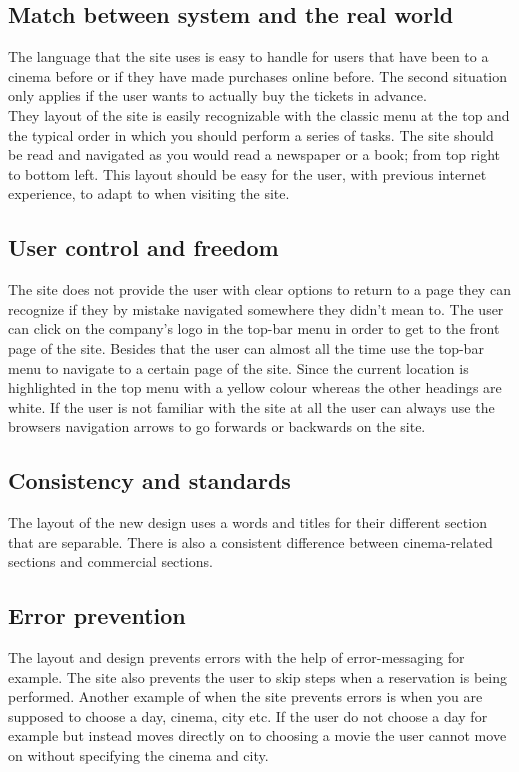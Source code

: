 \documentclass[a4paper,11pt]{article}
\begin{document}
\subsection{Match between system and the real world}
The language that the site uses is easy to handle for users that have been to a cinema before or if they have made purchases online before. The second situation only applies if the user wants to actually buy the tickets in advance. \\
They layout of the site is easily recognizable with the classic menu at the top and the typical order in which you should perform a series of tasks. The site should be read and navigated as you would read a newspaper or a book; from top right to bottom left. This layout should be easy for the user, with previous internet experience, to adapt to when visiting the site. 

\subsection{User control and freedom}
The site does not provide the user with clear options to return to a page they can recognize if they by mistake navigated somewhere they didn't mean to. The user can click on the company’s logo in the top-bar menu in order to get to the front page of the site. Besides that the user can almost all the time use the top-bar menu to navigate to a certain page of the site. Since the current location is highlighted in the top menu with a yellow colour whereas the other headings are white. 
If the user is not familiar with the site at all the user can always use the browsers navigation arrows to go forwards or backwards on the site.

\subsection{Consistency and standards}
The layout of the new design uses a words and titles for their different section that are separable. There is also a consistent difference between cinema-related sections and commercial sections. 

\subsection{Error prevention}
The layout and design prevents errors with the help of error-messaging for example. The site also prevents the user to skip steps when a reservation is being performed. Another example of when the site prevents errors is when you are supposed to choose a day, cinema, city etc. If the user do not choose a day for example but instead moves directly on to choosing a movie the user cannot move on without specifying the cinema and city. 
\end{document}
